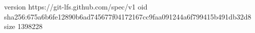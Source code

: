 version https://git-lfs.github.com/spec/v1
oid sha256:675a6b6fe12890b6ad745677f04172167cc9faa091244a6f799415b491db32d8
size 1398228
